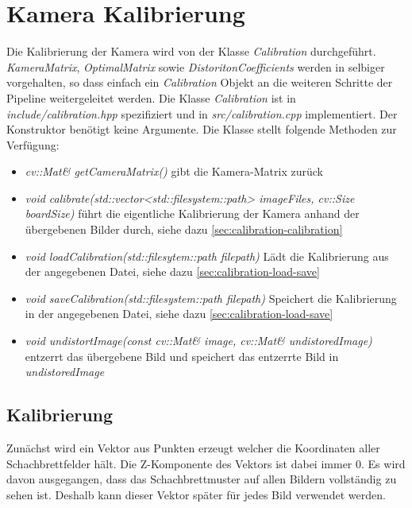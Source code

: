 \section{Kamera Kalibrierung}
Die Kalibrierung der Kamera wird von der Klasse \emph{Calibration} durchgeführt.
\emph{KameraMatrix}, \emph{OptimalMatrix} sowie \emph{DistoritonCoefficients} werden in selbiger vorgehalten, so dass einfach ein \emph{Calibration} Objekt an die weiteren Schritte der Pipeline weitergeleitet werden.
Die Klasse \emph{Calibration} ist in \emph{include/calibration.hpp} spezifiziert und in \emph{src/calibration.cpp} implementiert.
Der Konstruktor benötigt keine Argumente.
Die Klasse stellt folgende Methoden zur Verfügung:
\begin{itemize}
\item \emph{cv::Mat\& getCameraMatrix()} gibt die Kamera-Matrix zurück
\item \emph{void calibrate(std::vector<std::filesystem::path> imageFiles, cv::Size boardSize)} führt die eigentliche Kalibrierung der Kamera anhand der übergebenen Bilder durch, siehe dazu \autoref{sec:calibration-calibration}
\item \emph{void loadCalibration(std::filesytem::path filepath)} Lädt die Kalibrierung aus der angegebenen Datei, siehe dazu \autoref{sec:calibration-load-save}
\item \emph{void saveCalibration(std::filesystem::path filepath)} Speichert die Kalibrierung in der angegebenen Datei, siehe dazu \autoref{sec:calibration-load-save}
\item \emph{void undistortImage(const cv::Mat\& image, cv::Mat\& undistoredImage)} entzerrt das übergebene Bild und speichert das entzerrte Bild in \emph{undistoredImage}
\end{itemize}

\subsection{Kalibrierung}\label{sec:calibration-calibration}
Zunächst wird ein Vektor aus Punkten erzeugt welcher die Koordinaten aller Schachbrettfelder hält.
Die Z-Komponente des Vektors ist dabei immer 0.
Es wird davon ausgegangen, dass das Schachbrettmuster auf allen Bildern vollständig zu sehen ist.
Deshalb kann dieser Vektor später für jedes Bild verwendet werden.

